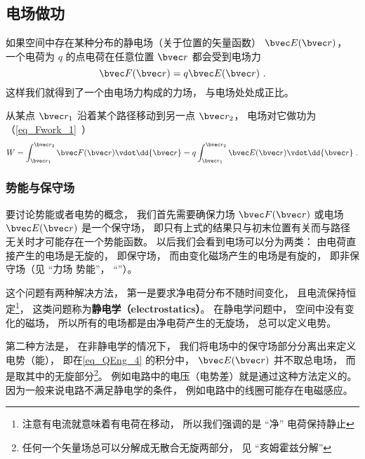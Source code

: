 

\subsection{电场做功}
如果空间中存在某种分布的静电场（关于位置的矢量函数） $\bvec E(\bvec r)$， 一个电荷为 $q$ 的点电荷在任意位置 $\bvec r$ 都会受到电场力
\begin{equation}
\bvec F(\bvec r) = q \bvec E(\bvec r)~.
\end{equation}
这样我们就得到了一个由电场力构成的力场， 与电场处处成正比。 

从某点 $\bvec r_1$ 沿着某个路径移动到另一点 $\bvec r_2$， 电场对它做功为（\autoref{eq_Fwork_1}~）
\begin{equation}\label{eq_QEng_4}
W = \int_{\bvec r_1}^{\bvec r_2} \bvec F(\bvec r) \vdot \dd{\bvec r} = q \int_{\bvec r_1}^{\bvec r_2} \bvec E(\bvec r) \vdot \dd{\bvec r}~.
\end{equation}

\subsubsection{势能与保守场}
要讨论势能或者电势的概念， 我们首先需要确保力场 $\bvec F(\bvec r)$ 或电场 $\bvec E(\bvec r)$ 是一个保守场， 即只有上式的结果只与初末位置有关而与路径无关时才可能存在一个势能函数。 以后我们会看到电场可以分为两类： 由电荷直接产生的电场是无旋的， 即保守场， 而由变化磁场产生的电场是有旋的， 即非保守场（见 “力场 势能”， “”）。

这个问题有两种解决方法， 第一是要求净电荷分布不随时间变化， 且电流保持恒定\footnote{注意有电流就意味着有电荷在移动， 所以我们强调的是 “净” 电荷保持静止}， 这类问题称为\textbf{静电学（electrostatics）}。 在静电学问题中， 空间中没有变化的磁场， 所以所有的电场都是由净电荷产生的无旋场， 总可以定义电势。

第二种方法是， 在非静电学的情况下， 我们将电场中的保守场部分分离出来定义电势（能）， 即在\autoref{eq_QEng_4} 的积分中， $\bvec E(\bvec r)$ 并不取总电场， 而是取其中的无旋部分\footnote{任何一个矢量场总可以分解成无散合无旋两部分， 见 “亥姆霍兹分解”}。 例如电路中的电压（电势差）就是通过这种方法定义的。 因为一般来说电路不满足静电学的条件， 例如电路中的线圈可能存在电磁感应。

